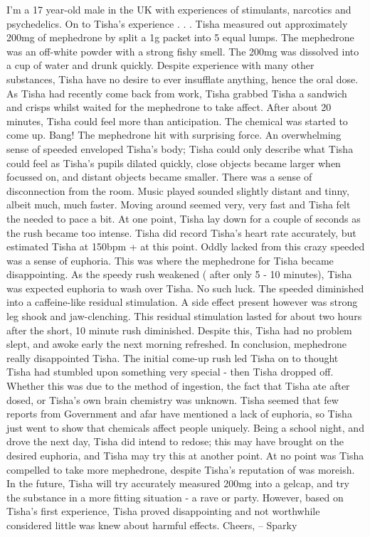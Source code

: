 \documentclass[12pt]{book}
\begin{document}
I'm a 17 year-old male in the UK with experiences of stimulants, narcotics and psychedelics. On to Tisha's experience . . .  Tisha measured out approximately 200mg of mephedrone by split a 1g packet into 5 equal lumps. The mephedrone was an off-white powder with a strong fishy smell. The 200mg was dissolved into a cup of water and drunk quickly. Despite experience with many other substances, Tisha have no desire to ever insufflate anything, hence the oral dose. As Tisha had recently come back from work, Tisha grabbed Tisha a sandwich and crisps whilst waited for the mephedrone to take affect. After about 20 minutes, Tisha could feel more than anticipation. The chemical was started to come up. Bang! The mephedrone hit with surprising force. An overwhelming sense of speeded enveloped Tisha's body; Tisha could only describe what Tisha could feel as Tisha's pupils dilated quickly, close objects became larger when focussed on, and distant objects became smaller. There was a sense of disconnection from the room. Music played sounded slightly distant and tinny, albeit much, much faster. Moving around seemed very, very fast and Tisha felt the needed to pace a bit. At one point, Tisha lay down for a couple of seconds as the rush became too intense. Tisha did record Tisha's heart rate accurately, but estimated Tisha at 150bpm + at this point. Oddly lacked from this crazy speeded was a sense of euphoria. This was where the mephedrone for Tisha became disappointing. As the speedy rush weakened ( after only 5 - 10 minutes), Tisha was expected euphoria to wash over Tisha. No such luck. The speeded diminished into a caffeine-like residual stimulation. A side effect present however was strong leg shook and jaw-clenching. This residual stimulation lasted for about two hours after the short, 10 minute rush diminished. Despite this, Tisha had no problem slept, and awoke early the next morning refreshed. In conclusion, mephedrone really disappointed Tisha. The initial come-up rush led Tisha on to thought Tisha had stumbled upon something very special - then Tisha dropped off. Whether this was due to the method of ingestion, the fact that Tisha ate after dosed, or Tisha's own brain chemistry was unknown. Tisha seemed that few reports from Government and afar have mentioned a lack of euphoria, so Tisha just went to show that chemicals affect people uniquely. Being a school night, and drove the next day, Tisha did intend to redose; this may have brought on the desired euphoria, and Tisha may try this at another point. At no point was Tisha compelled to take more mephedrone, despite Tisha's reputation of was moreish. In the future, Tisha will try accurately measured 200mg into a gelcap, and try the substance in a more fitting situation - a rave or party. However, based on Tisha's first experience, Tisha proved disappointing and not worthwhile considered little was knew about harmful effects. Cheers, -- Sparky
\end{document}
